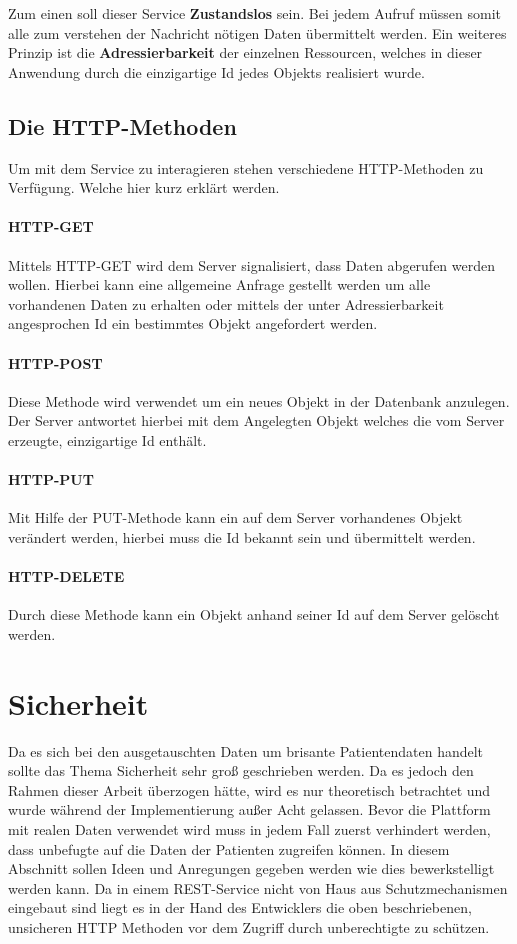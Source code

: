 Zum einen soll dieser Service \textbf{Zustandslos} sein. Bei jedem Aufruf müssen somit alle zum verstehen der Nachricht nötigen Daten übermittelt werden.
Ein weiteres Prinzip ist die \textbf{Adressierbarkeit} der einzelnen Ressourcen, welches in dieser Anwendung durch die einzigartige Id jedes Objekts realisiert wurde.
\subsection{Die HTTP-Methoden}
Um mit dem Service zu interagieren stehen verschiedene HTTP-Methoden zu Verfügung. Welche hier kurz erklärt werden.
\paragraph{HTTP-GET}
Mittels HTTP-GET wird dem Server signalisiert, dass Daten abgerufen werden wollen. Hierbei kann eine allgemeine Anfrage gestellt werden um alle vorhandenen Daten zu erhalten oder mittels der unter Adressierbarkeit angesprochen Id ein bestimmtes Objekt angefordert werden.
\paragraph{HTTP-POST}
Diese Methode wird verwendet um ein neues Objekt in der Datenbank anzulegen. Der Server antwortet hierbei mit dem Angelegten Objekt welches die vom Server erzeugte, einzigartige Id enthält.
\paragraph{HTTP-PUT}
Mit Hilfe der PUT-Methode kann ein auf dem Server vorhandenes Objekt verändert werden, hierbei muss die Id bekannt sein und übermittelt werden.
\paragraph{HTTP-DELETE}
Durch diese Methode kann ein Objekt anhand seiner Id auf dem Server gelöscht werden.

\section{Sicherheit}\label{_GrundlagenSicherheit}
Da es sich bei den ausgetauschten Daten um brisante Patientendaten handelt sollte das Thema Sicherheit sehr groß geschrieben werden. Da es jedoch den Rahmen dieser Arbeit überzogen hätte, wird es nur theoretisch betrachtet und wurde während der Implementierung außer Acht gelassen. Bevor die Plattform mit realen Daten verwendet wird muss in jedem Fall zuerst verhindert werden, dass unbefugte auf die Daten der Patienten zugreifen können. In diesem Abschnitt sollen Ideen und Anregungen gegeben werden wie dies bewerkstelligt werden kann. 
Da in einem REST-Service nicht von Haus aus Schutzmechanismen eingebaut sind liegt es in der Hand des Entwicklers die oben beschriebenen, unsicheren HTTP Methoden vor dem Zugriff durch unberechtigte zu schützen.

